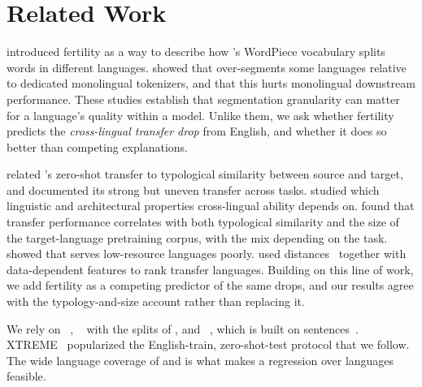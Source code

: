 \section{Related Work}
\label{sec:related}

\citet{acs2019exploring} introduced fertility as a way to describe how \mbert's WordPiece vocabulary splits words in different languages.
\citet{rust2021good} showed that \mbert over-segments some languages relative to dedicated monolingual tokenizers, and that this hurts monolingual downstream performance.
These studies establish that segmentation granularity can matter for a language's quality within a model.
Unlike them, we ask whether fertility predicts the \emph{cross-lingual transfer drop} from English, and whether it does so better than competing explanations.

\citet{pires2019multilingual} related \mbert's zero-shot transfer to typological similarity between source and target, and \citet{wu2019beto} documented its strong but uneven transfer across tasks.
\citet{k2020crosslingual} studied which linguistic and architectural properties cross-lingual ability depends on.
\citet{lauscher2020zero} found that transfer performance correlates with both typological similarity and the size of the target-language pretraining corpus, with the mix depending on the task.
\citet{wu2020all} showed that \mbert serves low-resource languages poorly.
\citet{lin2019choosing} used \uriel distances~\cite{littell2017uriel} together with data-dependent features to rank transfer languages.
Building on this line of work, we add fertility as a competing predictor of the same drops, and our results agree with the typology-and-size account rather than replacing it.

We rely on \xnli~\cite{conneau2018xnli}, \wikiann~\cite{pan2017wikiann} with the splits of \citet{rahimi2019massively}, and \sib~\cite{adelani2024sib200}, which is built on \flores sentences~\cite{nllb2022}.
\textsc{XTREME}~\cite{hu2020xtreme} popularized the English-train, zero-shot-test protocol that we follow.
The wide language coverage of \wikiann and \sib is what makes a regression over languages feasible.
